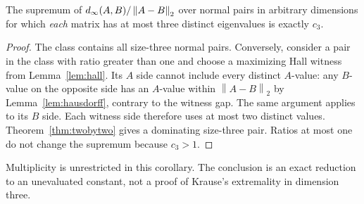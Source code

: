 \documentclass[11pt,letterpaper]{article}
\theoremstyle{remark}\newtheorem{remark}[theorem]{Remark}
\newcommand{\norm}[1]{\left\lVert#1\right\rVert_2}\newcommand{\abs}[1]{\left|#1\right|}\newcommand{\diag}{\operatorname{diag}}\newcommand{\rank}{\operatorname{rank}}
\begin{document}
\begin{corollary}\label{cor:threetypes}
The supremum of $\din(A,B)/\norm{A-B}$ over normal pairs in arbitrary dimensions for which \emph{each} matrix has at most three distinct eigenvalues is exactly $c_3$.
\end{corollary}
\begin{proof}
The class contains all size-three normal pairs. Conversely, consider a pair in the class with ratio greater than one and choose a maximizing Hall witness from Lemma~\ref{lem:hall}. Its $A$ side cannot include every distinct $A$-value: any $B$-value on the opposite side has an $A$-value within $\norm{A-B}$ by Lemma~\ref{lem:hausdorff}, contrary to the witness gap. The same argument applies to its $B$ side. Each witness side therefore uses at most two distinct values. Theorem~\ref{thm:twobytwo} gives a dominating size-three pair. Ratios at most one do not change the supremum because $c_3>1$.
\end{proof}
Multiplicity is unrestricted in this corollary. The conclusion is an exact reduction to an unevaluated constant, not a proof of Krause's extremality in dimension three.
\end{document}
